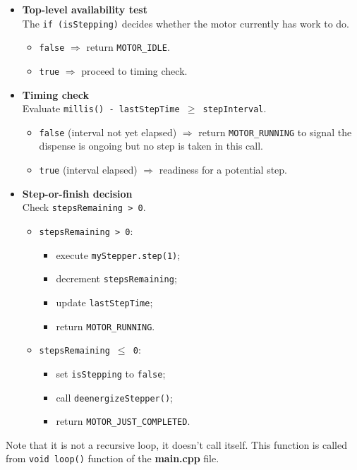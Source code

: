 \begin{itemize}
	\item \textbf{Top-level availability test}\\
	The \texttt{if (isStepping)} decides whether the motor currently has
	work to do.  
	\begin{itemize}
		\item \texttt{false} $\Rightarrow$ return
		\texttt{MOTOR\_IDLE}.
		\item \texttt{true}  $\Rightarrow$ proceed to timing check.
	\end{itemize}
	
	\item \textbf{Timing check}\\
	Evaluate \texttt{millis() - lastStepTime \(\ge\) stepInterval}.
	\begin{itemize}
		\item \texttt{false} (interval not yet elapsed)  
		$\Rightarrow$ return \texttt{MOTOR\_RUNNING} to signal
		the dispense is ongoing but no step is taken in this
		call.
		\item \texttt{true}  (interval elapsed) $\Rightarrow$
		readiness for a potential step.
	\end{itemize}
	
	\item \textbf{Step-or-finish decision}\\
	Check \texttt{stepsRemaining > 0}.
	\begin{itemize}
		\item \texttt{stepsRemaining > 0}:  
		\begin{itemize}
			\item execute \texttt{myStepper.step(1)};
			\item decrement \texttt{stepsRemaining};
			\item update \texttt{lastStepTime};
			\item return \texttt{MOTOR\_RUNNING}.
		\end{itemize}
		\item \texttt{stepsRemaining \(\le\) 0}:  
		\begin{itemize}
			\item set \texttt{isStepping} to \texttt{false};
			\item call \texttt{deenergizeStepper()};
			\item return \texttt{MOTOR\_JUST\_COMPLETED}.
		\end{itemize}
	\end{itemize}
\end{itemize}
Note that it is not a recursive loop, it doesn't call itself. This function is called from \texttt{void loop()} function of the \textbf{main.cpp} file.

